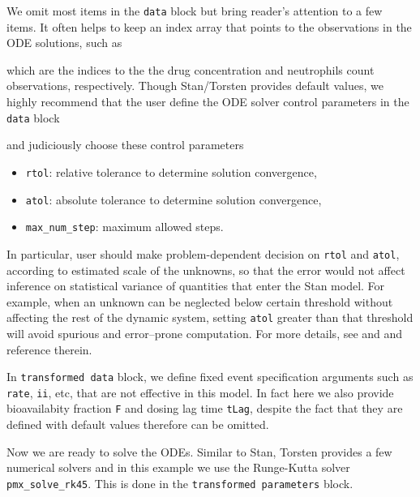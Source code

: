 We omit most items in the \texttt{data} block but bring reader's attention to a
few items. It often helps to keep an index array that points to the
observations in the ODE solutions, such as

which are the indices to the the drug concentration and neutrophils
count observations, respectively. Though Stan/Torsten provides
default values, we highly recommend that the user define the ODE
solver control parameters in the \texttt{data} block

and judiciously choose these control parameters
\begin{itemize}
\item \texttt{rtol}: relative tolerance to determine solution convergence,
\item \texttt{atol}: absolute tolerance to determine solution convergence,
\item \texttt{max\_num\_step}: maximum allowed steps.
\end{itemize}
In particular, user should make problem-dependent decision on \texttt{rtol} and \texttt{atol},
according to estimated scale of the unknowns, so that the error would
not affect inference on statistical variance of quantities that enter
the Stan model. For example, when an unknown can be neglected below
certain threshold without affecting the rest of the dynamic system,
setting \texttt{atol} greater than that threshold will avoid spurious and
error--prone computation. For more details, see \cite[Chapter 13]{Stan_users_guide:2021}
and \cite[Section 3.7.5]{Torsten:2021} and reference therein.

In \texttt{transformed data} block, we define fixed event specification
arguments such as \texttt{rate}, \texttt{ii}, etc, that are not
effective in this model. In fact here we also provide bioavailabity fraction \texttt{F} and dosing lag
time \texttt{tLag}, despite the fact that they are defined with default values
therefore can be omitted.


Now we are ready to solve the ODEs. Similar to Stan, Torsten provides
a few numerical solvers and in this
example we use the Runge-Kutta solver
\texttt{pmx\_solve\_rk45}\cite[Section 3.4]{Torsten:2021}. This
is done in the \texttt{transformed parameters} block.



